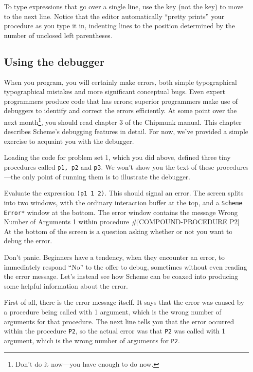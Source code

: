 To type expressions that go over a single line, use the 
key (not the  key) to move to the next line.  Notice that
the editor automatically ``pretty prints'' your procedure as you type
it in, indenting lines to the position determined by the number of
unclosed left parentheses.

\subsection{Using the debugger}

When you program, you will certainly make errors, both simple typographical
typographical mistakes and more significant conceptual bugs.  Even expert
programmers produce code that has errors; superior programmers make use of
debuggers to identify and correct the errors efficiently.  At some point over
the next month\footnote{Don't do it now---you have enough to do now.}, you
should read chapter 3 of the Chipmunk manual.  This chapter describes Scheme's
debugging features in detail.  For now, we've provided a simple exercise to
acquaint you with the debugger.

Loading the code for problem set 1, which you did above, defined three
tiny procedures called {\tt p1, p2} and {\tt p3}.  We won't show you
the text of these procedures---the only point of running them is to
illustrate the debugger.

Evaluate the expression {\tt (p1 1 2)}.  This should signal an error.
The screen splits into two windows, with the ordinary interaction
buffer at the top, and a {\tt *Scheme Error*} window at the bottom.
The error window contains the message
\beginlisp
Wrong Number of Arguments 1
within procedure \#[COMPOUND-PROCEDURE P2]
\endlisp
At the bottom of the screen is a question asking whether or not you
want to debug the error.

Don't panic.  Beginners have a tendency, when they encounter an error,
to immediately respond ``No'' to the offer to debug, sometimes without
even reading the error message.  Let's instead see how Scheme can be
coaxed into producing some helpful information about the error.

First of all, there is the error message itself.  It says that the
error was caused by a procedure being called with 1 argument, which is
the wrong number of arguments for that procedure.  The next line tells
you that the error occurred within the procedure {\tt P2}, so the
actual error was that {\tt P2} was called with 1 argument, which is
the wrong number of arguments for {\tt P2}.

